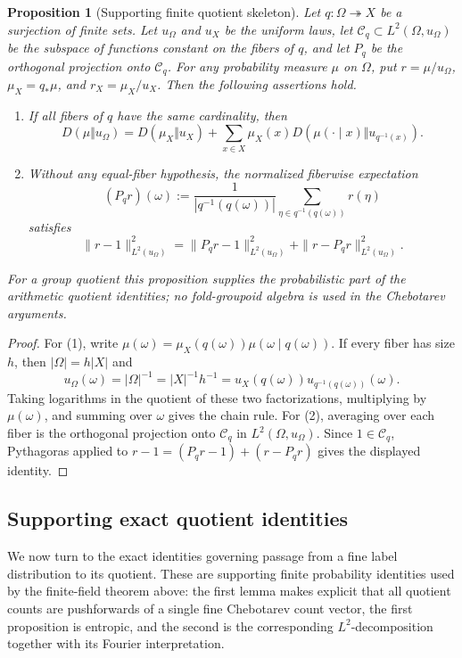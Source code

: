 \documentclass[12pt,a4paper]{article}
\theoremstyle{plain}
\newtheorem{proposition}[theorem]{Proposition}
\theoremstyle{definition}
\numberwithin{equation}{section}
\begin{document}


\begin{proposition}[Supporting finite quotient skeleton]\label{prop:supporting-finite-quotient-skeleton}
Let \(q:\Omega\twoheadrightarrow X\) be a surjection of finite sets. Let \(u_\Omega\) and \(u_X\) be the uniform laws, let \(\mathcal C_q\subset L^2(\Omega,u_\Omega)\) be the subspace of functions constant on the fibers of \(q\), and let \(P_q\) be the orthogonal projection onto \(\mathcal C_q\). For any probability measure \(\mu\) on \(\Omega\), put \(r=\mu/u_\Omega\), \(\mu_X=q_\ast\mu\), and \(r_X=\mu_X/u_X\). Then the following assertions hold.
\begin{enumerate}
\normalfont
  \item If all fibers of \(q\) have the same cardinality, then
  \[
  D(\mu\Vert u_\Omega)=D(\mu_X\Vert u_X)+\sum_{x\in X}\mu_X(x)D(\mu(\cdot\mid x)\Vert u_{q^{-1}(x)}).
  \]
  \item Without any equal-fiber hypothesis, the normalized fiberwise expectation
  \[
  (P_qr)(\omega):=\frac{1}{|q^{-1}(q(\omega))|}\sum_{\eta\in q^{-1}(q(\omega))}r(\eta)
  \]
  satisfies
  \[
  \|r-1\|_{L^2(u_\Omega)}^2=\|P_qr-1\|_{L^2(u_\Omega)}^2+\|r-P_qr\|_{L^2(u_\Omega)}^2.
  \]
\end{enumerate}
For a group quotient this proposition supplies the probabilistic part of the arithmetic quotient identities; no fold-groupoid algebra is used in the Chebotarev arguments.
\end{proposition}

\begin{proof}
For (1), write \(\mu(\omega)=\mu_X(q(\omega))\mu(\omega\mid q(\omega))\). If every fiber has size \(h\), then \(|\Omega|=h|X|\) and
\[
u_\Omega(\omega)=|\Omega|^{-1}=|X|^{-1}h^{-1}=u_X(q(\omega))u_{q^{-1}(q(\omega))}(\omega).
\]
Taking logarithms in the quotient of these two factorizations, multiplying by \(\mu(\omega)\), and summing over \(\omega\) gives the chain rule. For (2), averaging over each fiber is the orthogonal projection onto \(\mathcal C_q\) in \(L^2(\Omega,u_\Omega)\). Since \(1\in\mathcal C_q\), Pythagoras applied to \(r-1=(P_qr-1)+(r-P_qr)\) gives the displayed identity.
\end{proof}

\subsection{Supporting exact quotient identities}
We now turn to the exact identities governing passage from a fine label distribution to its quotient. These are supporting finite probability identities used by the finite-field theorem above: the first lemma makes explicit that all quotient counts are pushforwards of a single fine Chebotarev count vector, the first proposition is entropic, and the second is the corresponding \(L^2\)-decomposition together with its Fourier interpretation.
\end{document}
